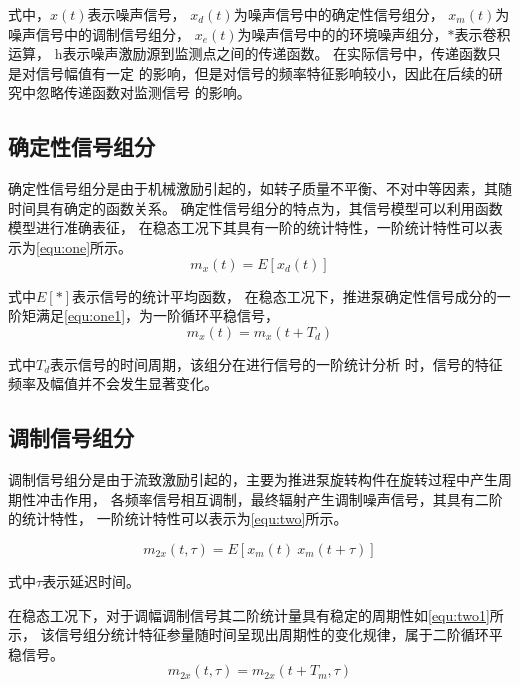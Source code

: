 式中，$x\left ( t \right )$表示噪声信号，
$x_d\left ( t \right )$为噪声信号中的确定性信号组分，
$x_m\left ( t \right )$为噪声信号中的调制信号组分，
$x_e\left ( t \right )$为噪声信号中的的环境噪声组分，$\ast$表示卷积运算，
h表示噪声激励源到监测点之间的传递函数。 
在实际信号中，传递函数只是对信号幅值有一定
的影响，但是对信号的频率特征影响较小，因此在后续的研究中忽略传递函数对监测信号
的影响。 
\subsection{确定性信号组分}
确定性信号组分是由于机械激励引起的，如转子质量不平衡、不对中等因素，其随时间具有确定的函数关系。
确定性信号组分的特点为，其信号模型可以利用函数模型进行准确表征，
在稳态工况下其具有一阶的统计特性，一阶统计特性可以表示为\autoref{equ:one}所示。
\begin{equation}
    \label{equ:one}
    m_{x}\left ( t \right ) =E\left [ x_{d}\left ( t   \right )  \right ]
\end{equation}

式中$E[*]$表示信号的统计平均函数，
在稳态工况下，推进泵确定性信号成分的一阶矩满足\autoref{equ:one1}，为一阶循环平稳信号，
\begin{equation}
    \label{equ:one1}
    m_{x}\left ( t \right ) =m_{x}\left ( t+T_d \right )
\end{equation}

式中$T_{d}$表示信号的时间周期，该组分在进行信号的一阶统计分析
时，信号的特征频率及幅值并不会发生显著变化。
\subsection{调制信号组分}
调制信号组分是由于流致激励引起的，主要为推进泵旋转构件在旋转过程中产生周期性冲击作用，
各频率信号相互调制，最终辐射产生调制噪声信号，其具有二阶的统计特性，
一阶统计特性可以表示为\autoref{equ:two}所示。

\begin{equation}
    \label{equ:two}
    m_{2x}\left ( t, \tau \right )  =E\left [ x_{m}\left ( t \right ) \ x_{m}\left ( t+\tau \right )  \right ] 
\end{equation}

式中$\tau$表示延迟时间。

在稳态工况下，对于调幅调制信号其二阶统计量具有稳定的周期性如\autoref{equ:two1}所示，
该信号组分统计特征参量随时间呈现出周期性的变化规律，属于二阶循环平稳信号。
\begin{equation}
    \label{equ:two1}
    m_{2x}\left ( t, \tau \right )  =m_{2x}\left ( t+T_m, \tau \right )
\end{equation}

